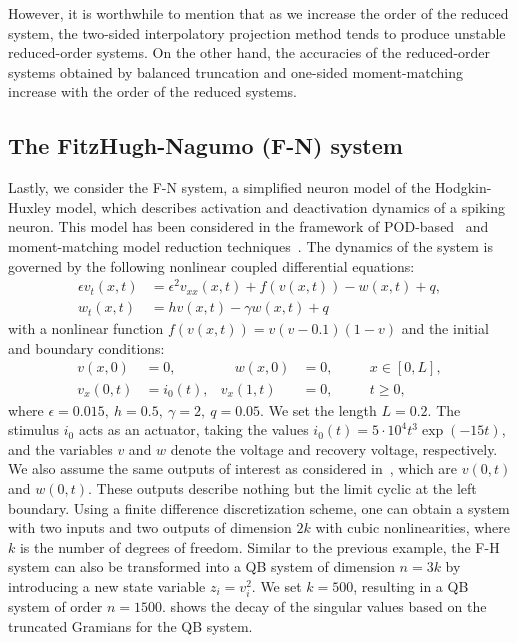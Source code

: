 However, it is worthwhile to mention  that as we increase the order of the reduced system, the two-sided interpolatory projection method tends to produce unstable reduced-order systems. On the other hand, the accuracies of the reduced-order systems obtained by balanced truncation and one-sided moment-matching increase with the order of the reduced systems.

\subsection{The FitzHugh-Nagumo (F-N) system}
Lastly, we consider the F-N system, a simplified neuron model of the Hodgkin-Huxley model, which describes activation and deactivation dynamics of a spiking neuron. This model has been considered in the framework of POD-based~\cite{morChaS10} and moment-matching model reduction techniques~\cite{morBenB12a}. The dynamics of the system is governed by the following nonlinear coupled differential equations:
\begin{equation}
\begin{aligned}
\epsilon v_t(x,t) & =\epsilon^2v_{xx}(x,t) + f(v(x,t)) -w(x,t) + q,\\
w_t(x,t) &= hv(x,t) -\gamma w(x,t) + q
\end{aligned}
\end{equation}
with a nonlinear function $f(v(x,t)) = v(v-0.1)(1-v)$  and the initial and boundary conditions:
\begin{equation}
\begin{aligned}
v(x,0) &=0, &\quad w(x,0)&=0, \quad & &x\in [0,L],\\
v_x(0,t) &= i_0(t), & v_x(1,t) &= 0, & &t\geq 0,
\end{aligned}
\end{equation}
where $\epsilon = 0.015,~h=0.5,~\gamma = 2,~q = 0.05$. We set the length $L = 0.2$. The stimulus $i_0$ acts as an actuator, taking the values $i_0(t) = 5\cdot 10^4t^3\exp(-15t)$, and the variables $v$ and $w$ denote the voltage and recovery voltage, respectively. We also assume the same outputs of interest as considered in~\cite{morBenB12a}, which are $v(0,t)$ and $w(0,t)$. These outputs describe nothing but the limit cyclic at the left boundary. Using a finite difference discretization scheme, one can obtain a system with two inputs and two outputs of  dimension $2 k$ with cubic nonlinearities, where $k$ is the number of degrees of freedom.   Similar to the previous  example, the F-H system can also be transformed into a QB system of dimension $n = 3 k$ by introducing a new state variable $z_i = v_i^2$. We set $k = 500$,  resulting in a QB system of order $n = 1500$.   shows the decay of the singular values  based on the truncated Gramians for the QB system.
